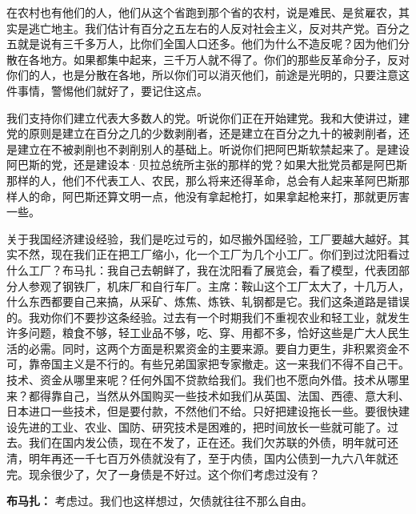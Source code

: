 \begin{duihua}
在农村也有他们的人，他们从这个省跑到那个省的农村，说是难民、是贫雇农，其实是逃亡地主。我们估计有百分之五左右的人反对社会主义，反对共产党。百分之五就是说有三千多万人，比你们全国人口还多。他们为什么不造反呢？因为他们分散在各地方。如果都集中起来，三千万人就不得了。你们的那些反革命分子，反对你们的人，也是分散在各地，所以你们可以消灭他们，前途是光明的，只要注意这件事情，警惕他们就好了，要记住这点。

我们支持你们建立代表大多数人的党。听说你们正在开始建党。我和大使讲过，建党的原则是建立在百分之几的少数剥削者，还是建立在百分之九十的被剥削者，还是建立在不被剥削也不剥削别人的基础上。听说你们把阿巴斯软禁起来了。是建设阿巴斯的党，还是建设本·贝拉总统所主张的那样的党？如果大批党员都是阿巴斯那样的人，他们不代表工人、农民，那么将来还得革命，总会有人起来革阿巴斯那样人的命，阿巴斯还算文明一点，他没有拿起枪打，如果拿起枪来打，那就更厉害一些。

关于我国经济建设经验，我们是吃过亏的，如尽搬外国经验，工厂要越大越好。其实不然，现在我们正在把工厂缩小，化一个工厂为几个小工厂。你们到过沈阳看过什么工厂？布马扎：我自己去朝鲜了，我在沈阳看了展览会，看了模型，代表团部分人参观了钢铁厂，机床厂和自行车厂。主席：鞍山这个工厂太大了，十几万人，什么东西都要自己来搞，从采矿、炼焦、炼铁、轧钢都是它。我们这条道路是错误的。我劝你们不要抄这条经验。过去有一个时期我们不重视农业和轻工业，就发生许多问题，粮食不够，轻工业品不够，吃、穿、用都不多，恰好这些是广大人民生活的必需。同时，这两个方面是积累资金的主要来源。要自力更生，非积累资金不可，靠帝国主义是不行的。有些兄弟国家把专家撤走。这一来我们不得不自己干。技术、资金从哪里来呢？任何外国不贷款给我们。我们也不愿向外借。技术从哪里来？都得靠自己，当然从外国购买一些技术如我们从英国、法国、西德、意大利、日本进口一些技术，但是要付款，不然他们不给。只好把建设拖长一些。要很快建设先进的工业、农业、国防、研究技术是困难的，把时间放长一些就可能了。过去。我们在国内发公债，现在不发了，正在还。我们欠苏联的外债，明年就可还清，明年再还一千七百万外债就没有了，至于内债，国内公债到一九六八年就还完。现余很少了，欠了一身债是不好过。这个你们考虑过没有？

\item[\textbf{布马扎：}] 考虑过。我们也这样想过，欠债就往往不那么自由。


\end{duihua}

